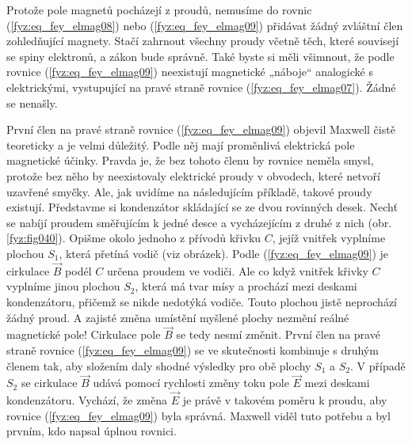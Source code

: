     Protože pole magnetů pocházejí z proudů, nemusíme do rovnic (\ref{fyz:eq_fey_elmag08}) nebo
    (\ref{fyz:eq_fey_elmag09}) přidávat žádný zvláštní člen zohledňující magnety. Stačí zahrnout 
    všechny proudy včetně těch, které souvisejí se spiny elektronů, a zákon bude správně. Také 
    byste si měli všimnout, že podle rovnice (\ref{fyz:eq_fey_elmag09}) neexistují magnetické 
    „náboje“ analogické s elektrickými, vystupující na pravé straně rovnice 
    (\ref{fyz:eq_fey_elmag07}). Žádné se nenašly.


    První člen na pravé straně rovnice (\ref{fyz:eq_fey_elmag09}) objevil Maxwell čistě teoreticky 
    a je velmi důležitý. Podle něj mají proměnlivá elektrická pole magnetické účinky. Pravda je, že 
    bez tohoto členu by rovnice neměla smysl, protože bez něho by neexistovaly elektrické proudy v 
    obvodech, které netvoří uzavřené smyčky. Ale, jak uvidíme na následujícím příkladě, takové 
    proudy existují. Představme si kondenzátor skládající se ze dvou rovinných desek. Nechť se 
    nabíjí proudem směřujícím k jedné desce a vycházejícím z druhé z nich (obr. 
    \ref{fyz:fig040}). Opišme okolo jednoho z přívodů křivku \(C\), jejíž vnitřek vyplníme 
    plochou \(S_1\), která přetíná vodič (viz obrázek). Podle (\ref{fyz:eq_fey_elmag09}) je 
    cirkulace \(\vec{B}\) podél \(C\) určena proudem ve vodiči. Ale co když vnitřek křivky \(C\) 
    vyplníme jinou plochou \(S_2\), která má tvar mísy a prochází mezi deskami kondenzátoru, 
    přičemž se nikde nedotýká vodiče. Touto plochou jistě neprochází žádný proud. A zajisté 
    změna umístění myšlené plochy nezmění reálné magnetické pole! Cirkulace pole \(\vec{B}\) se 
    tedy nesmí změnit. První člen na pravé straně rovnice (\ref{fyz:eq_fey_elmag09}) se ve 
    skutečnosti kombinuje s druhým členem tak, aby složením daly shodné výsledky pro obě plochy 
    \(S_1\) a \(S_2\). V případě \(S_2\) se cirkulace \(\vec{B}\) udává pomocí rychlosti změny toku 
    pole \(\vec{E}\) mezi deskami kondenzátoru. Vychází, že změna \(\vec{E}\) je právě v takovém 
    poměru k proudu, aby rovnice (\ref{fyz:eq_fey_elmag09}) byla správná. Maxwell viděl tuto 
    potřebu a byl prvním, kdo napsal úplnou rovnici.

      
